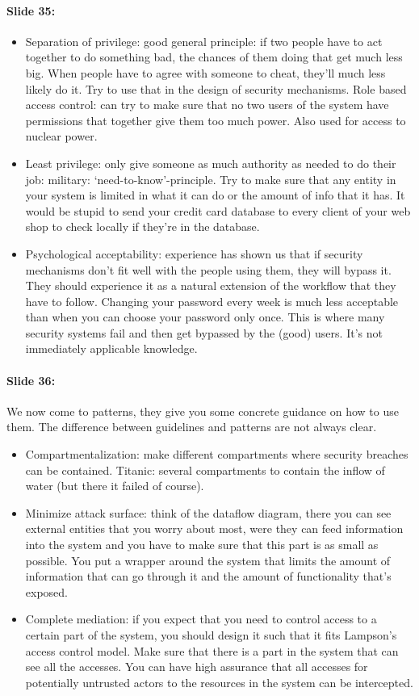 \documentclass[10pt,a4paper]{report}
\begin{document}
\paragraph{Slide 35:} 
\begin{itemize}
\item Separation of privilege: good general principle: if two people have to act together to do something bad, the chances of them doing that get much less big. When people have to agree with someone to cheat, they'll much less likely do it. Try to use that in the design of security mechanisms. Role based access control: can try to make sure that no two users of the system have permissions that together give them too much power. Also used for access to nuclear power. 
\item Least privilege: only give someone as much authority as needed to do their job: military: `need-to-know'-principle. Try to make sure that any entity in your system is limited in what it can do or the amount of info that it has. It would be stupid to send your credit card database to every client of your web shop to check locally if they're in the database. 
\item Psychological acceptability: experience has shown us that if security mechanisms don't fit well with the people using them, they will bypass it. They should experience it as a natural extension of the workflow that they have to follow. Changing your password every week is much less acceptable than when you can choose your password only once. This is where many security systems fail and then get bypassed by the (good) users. It's not immediately applicable knowledge.
\end{itemize}

\paragraph{Slide 36:} We now come to patterns, they give you some concrete guidance on how to use them. The difference between guidelines and patterns are not always clear. 
\begin{itemize}
\item Compartmentalization: make different compartments where security breaches can be contained. Titanic: several compartments to contain the inflow of water (but there it failed of course).
\item Minimize attack surface: think of the dataflow diagram, there you can see external entities that you worry about most, were they can feed information into the system and you have to make sure that this part is as small as possible. You put a wrapper around the system that limits the amount of information that can go through it and the amount of functionality that's exposed.
\item Complete mediation: if you expect that you need to control access to a certain part of the system, you should design it such that it fits Lampson's access control model. Make sure that there is a part in the system that can see all the accesses. You can have high assurance that all accesses for potentially untrusted actors to the resources in the system can be intercepted.
\end{itemize}
\end{document}
